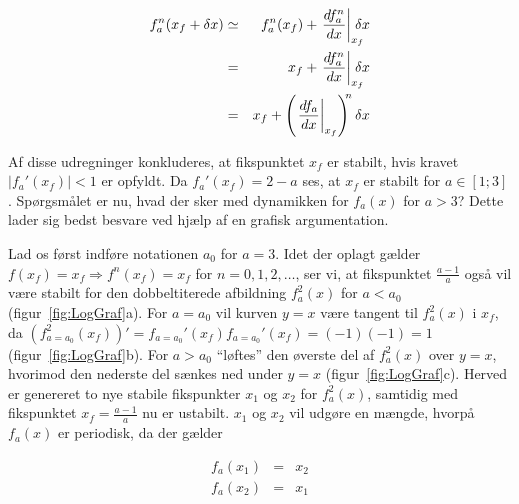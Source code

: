 \begin{eqnarray}
 f^n_a(x_f + \delta x) & \simeq & f^n_a(x_f) + 
 \left.\frac{df_a^n}{dx}\right|_{x_f} \negsp\delta x                \nonumber\\
 & = & x_f + \left.\frac{df_a^n}{dx}\right|_{x_f}  \negsp\delta x\nonumber\\
 & = & x_f + \left(\left.\frac{df_a}{dx}\right|_{x_f}\right)^{\!\! n}\delta x
\end{eqnarray}

Af disse udregninger konkluderes, at fikspunktet $x_f$ er
stabilt, hvis kravet $|f_a'(x_f)| < 1$ er opfyldt. Da
$f_a'(x_f)=2-a$ ses, at $x_f$ er stabilt for $a \in [1;3]$.
Sp{\o}rgsm{\aa}let er nu, hvad der sker med dynamikken for
$f_a(x)$ for $a>3$? Dette lader sig bedst besvare ved
hj{\ae}lp af en grafisk argumentation.

\vspace{4.0mm}
Lad os f{\o}rst indf{\o}re notationen $a_0$ for $a=3$. Idet
der oplagt g{\ae}lder $f(x_f)=x_f \Rightarrow f^n(x_f)=x_f$
for $n=0,1,2,\ldots$, ser vi, at fikspunktet
$\frac{a-1}{a}$ ogs{\aa} vil v{\ae}re stabilt for den
dobbeltiterede afbildning $f^2_a(x)$ for $a<a_0$
(figur~\ref{fig:LogGraf}a). For $a=a_0$ vil kurven $y=x$
v{\ae}re tangent til $f^2_a(x)$ i $x_f$, da
$(f^2_{a=a_0}(x_f))' = f_{a=a_0}'(x_f) f_{a=a_0}'(x_f) =
(-1)(-1) = 1$ (figur~\ref{fig:LogGraf}b). For $a>a_0$
``l{\o}ftes'' den {\o}verste del af $f_a^2(x)$ over $y=x$,
hvorimod den nederste del s{\ae}nkes ned under $y=x$
(figur~\ref{fig:LogGraf}c). Herved er genereret to nye
stabile fikspunkter $x_1$ og $x_2$ for $f^2_a(x)$, samtidig
med fikspunktet $x_f=\frac{a-1}{a}$ nu er ustabilt. $x_1$
og $x_2$ vil udg{\o}re en m{\ae}ngde, hvorp{\aa} $f_a(x)$
er periodisk, da der g{\ae}lder

\begin{equation}
 \begin{array}{lcl}
  f_a(x_1) & = & x_2 \\
  f_a(x_2) & = & x_1 
 \end{array}
 \label{eq:Pitch}
\end{equation}

